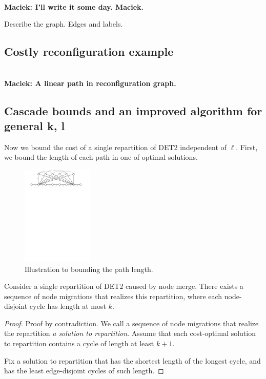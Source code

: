 \documentclass[manuscript,screen=true, review, anonymous]{acmart}
\newcommand\maciek[1]{\color{brown}\textbf{\\ Maciek: #1}\color{black}}
\begin{document}
\maciek{I'll write it some day. Maciek.}

Describe the graph. Edges and labels.

\subsection{Costly reconfiguration example}

\maciek{A linear path in reconfiguration graph.}

\subsection{Cascade bounds and an improved algorithm for general k, l}


Now we bound the cost of a single repartition of DET2 independent of $\ell$.
First, we bound the length of each path in one of optimal solutions.


\begin{figure}[H]
  \centering
    \includegraphics[width=0.3\textwidth]{figs/substitute}
    \caption{Illustration to bounding the path length.}
    \label{fig:nptree-construction}
  \end{figure}

\begin{theorem}
  \label{th:cascade-paths}
  Consider a single repartition of DET2 caused by node merge.
  There exists a sequence of node migrations that realizes this repartition, where each node-disjoint cycle has length at most $k$.
\end{theorem}

\begin{proof}

Proof by contradiction.
We call a sequence of node migrations that realize the repartition \emph{a solution to repartition}.
Assume that each cost-optimal solution to repartition contains a cycle of length at least $k+1$.

Fix a solution to repartition that has the shortest length of the longest cycle, and has the least edge-disjoint cycles of such length.

\end{proof}
\end{document}
